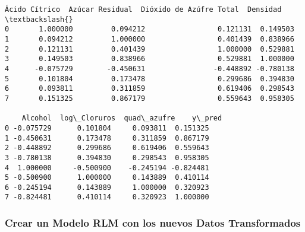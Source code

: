 \documentclass[11pt]{article}
\makeatletter
\newcommand{\boxspacing}{\kern\kvtcb@left@rule\kern\kvtcb@boxsep}
\newcommand{\prompt}[4]{
        {\ttfamily\llap{{\color{#2}[#3]:\hspace{3pt}#4}}\vspace{-\baselineskip}}
    }
\makeatother
\begin{document}
            \begin{tcolorbox}[breakable, size=fbox, boxrule=.5pt, pad at break*=1mm, opacityfill=0]
\prompt{Out}{outcolor}{180}{\boxspacing}
\begin{Verbatim}[commandchars=\\\{\}]
   Ácido Cítrico  Azúcar Residual  Dióxido de Azúfre Total  Densidad  \textbackslash{}
0       1.000000         0.094212                 0.121131  0.149503
1       0.094212         1.000000                 0.401439  0.838966
2       0.121131         0.401439                 1.000000  0.529881
3       0.149503         0.838966                 0.529881  1.000000
4      -0.075729        -0.450631                -0.448892 -0.780138
5       0.101804         0.173478                 0.299686  0.394830
6       0.093811         0.311859                 0.619406  0.298543
7       0.151325         0.867179                 0.559643  0.958305

    Alcohol  log\_Cloruros  quad\_azufre    y\_pred
0 -0.075729      0.101804     0.093811  0.151325
1 -0.450631      0.173478     0.311859  0.867179
2 -0.448892      0.299686     0.619406  0.559643
3 -0.780138      0.394830     0.298543  0.958305
4  1.000000     -0.500900    -0.245194 -0.824481
5 -0.500900      1.000000     0.143889  0.410114
6 -0.245194      0.143889     1.000000  0.320923
7 -0.824481      0.410114     0.320923  1.000000
\end{Verbatim}
\end{tcolorbox}
        
    \subsubsection{Crear un Modelo RLM con los nuevos Datos
Transformados}\label{crear-un-modelo-rlm-con-los-nuevos-datos-transformados}
\end{document}
